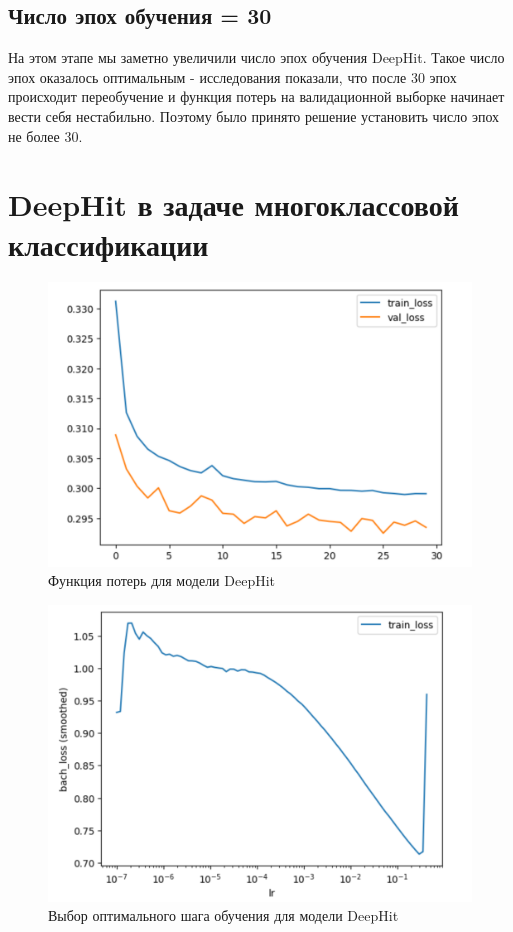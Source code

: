 \documentclass[a4paper,14pt,oneside,openany]{memoir}
\begin{document}
\subsection{Число эпох обучения = 30}

На этом этапе мы заметно увеличили число эпох обучения DeepHit. Такое число эпох оказалось оптимальным - исследования показали, что после 30 эпох происходит переобучение и функция потерь на валидационной выборке начинает вести себя нестабильно. Поэтому было принято решение установить число эпох не более 30.  


\section{DeepHit в задаче многоклассовой классификации}

\begin{figure}[H]
	\includegraphics[width=\textwidth]{../figures/deephit_losses_30_epoch.png}
	\caption{Функция потерь для модели DeepHit}
\end{figure}

\begin{figure}[H]
	\includegraphics[width=\textwidth]{../figures/deephit_losses_30_epoch_lr.png}
	\caption{Выбор оптимального шага обучения для модели DeepHit}
\end{figure}
\end{document}
